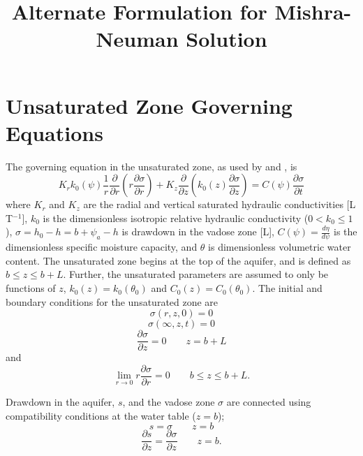 \documentclass[12pt,letterpaper]{article}
\title{Alternate Formulation for Mishra-Neuman Solution}
\begin{document}
\maketitle
\linenumbers
\section{Unsaturated Zone Governing Equations}
The governing equation in the unsaturated zone, as used by \cite{mishra10} and \cite{tartakovsky07}, is
\begin{equation}
  \label{eq:unsatDim}
  K_r k_0(\psi) \frac{1}{r} \frac{\partial}{\partial r} \left( r\frac{\partial \sigma}{\partial r} \right) + K_z \frac{\partial}{\partial z} \left( k_0(z) \frac{\partial \sigma}{\partial z}\right) = C(\psi) \frac{\partial \sigma}{\partial t}
\end{equation}
where $K_r$ and $K_z$ are the radial and vertical saturated hydraulic conductivities [L T$^{-1}$], $k_0$ is the dimensionless isotropic relative hydraulic conductivity ($0 < k_0 \le 1$), $\sigma = h_0 - h = b +\psi_a - h$ is drawdown in the vadose zone [L], $C(\psi)=\frac{d\eta}{d \psi}$ is the dimensionless specific moisture capacity, and $\theta$ is dimensionless volumetric water content.  The unsaturated zone begins at the top of the aquifer, and is defined as $b \le z \le b+L$.  Further, the unsaturated parameters are assumed to only be functions of $z$, $k_0(z)=k_0(\theta_0)$ and $C_0(z)=C_0(\theta_0)$.  The initial and boundary conditions for the unsaturated zone are  
\begin{equation}\nonumber
\sigma(r,z,0) = 0
\end{equation}
\begin{equation}\nonumber
\sigma(\infty,z,t)=0
\end{equation}
\begin{equation}\nonumber
\frac{\partial \sigma}{\partial z}=0 \qquad z=b+L
\end{equation} and 
\begin{equation}\nonumber
\lim_{r \rightarrow 0} r \frac{\partial \sigma}{\partial r} = 0 \qquad b\le z \le b+L.
\end{equation}

Drawdown in the aquifer, $s$, and the vadose zone $\sigma$ are connected using compatibility conditions at the water table ($z=b$);
\begin{equation}\nonumber
s=\sigma \qquad z=b
\end{equation}
\begin{equation}\nonumber
\frac{\partial s}{\partial z}=\frac{\partial \sigma}{\partial z} \qquad z=b.
\end{equation} 
\end{document}
